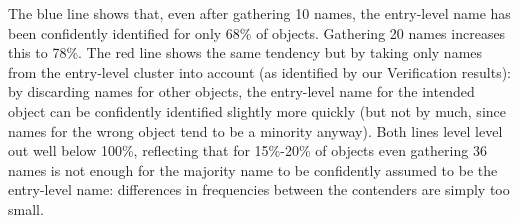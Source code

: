 The blue line shows that, even after gathering 10 names, the entry-level name has been confidently identified for only 68\% of objects.
Gathering 20 names increases this to 78\%.
The red line shows the same tendency but by taking only names from the entry-level cluster into account (as identified by our Verification results):
by discarding names for other objects, the entry-level name for the intended object can be confidently identified slightly more quickly (but not by much, since names for the wrong object tend to be a minority anyway).
Both lines level level out well below 100\%, reflecting that for 15\%-20\% of objects even gathering 36 names is not enough for the majority name to be confidently assumed to be the entry-level name: differences in frequencies between the contenders are simply too small.


